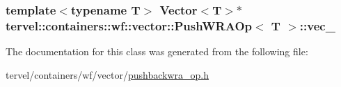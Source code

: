 \subsubsection[{vec\+\_\+}]{\setlength{\rightskip}{0pt plus 5cm}template$<$typename T$>$ Vector$<$T$>$$\ast$ {\bf tervel\+::containers\+::wf\+::vector\+::\+Push\+W\+R\+A\+Op}$<$ T $>$\+::vec\+\_\+\hspace{0.3cm}{\ttfamily [private]}}\label{classtervel_1_1containers_1_1wf_1_1vector_1_1_push_w_r_a_op_ae68e6c5e445fcf86aee12bc6e2d1f6bf}


The documentation for this class was generated from the following file\+:\begin{DoxyCompactItemize}
\item 
tervel/containers/wf/vector/\hyperlink{pushbackwra__op_8h}{pushbackwra\+\_\+op.\+h}\end{DoxyCompactItemize}
